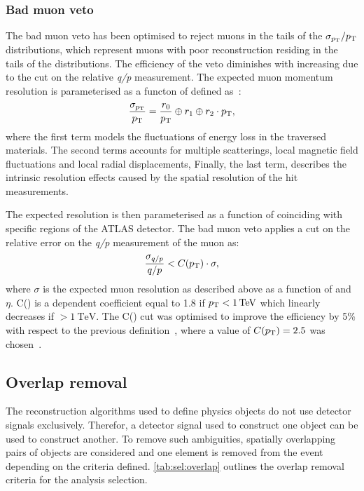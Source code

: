 \subsubsection{Bad muon veto}\label{sec:selmm:badmuon}
The bad muon veto has been optimised to reject muons in the tails of the $\sigma_{p_{\text{T}}}/p_{\text{T}}$ distributions, which represent muons with poor reconstruction residing in the tails of the \pt distributions. The efficiency of the veto diminishes with increasing \pt due to the cut on the relative \emph{q/p} measurement. The expected muon momentum resolution is parameterised as a functon of \pt defined as~\cite{Aad:2016jkr}:
\begin{equation}
   \frac{\sigma_{p_{\text{T}}}}{p_{\text{T}}} = \frac{r_0}{p_{\text{T}}} \oplus r_1 \oplus r_2 \cdot p_{\text{T}},
\end{equation}
where the first term models the fluctuations of energy loss in the traversed materials. The second terms accounts for multiple scatterings, local magnetic field fluctuations and local radial displacements, Finally, the last term, describes the intrinsic resolution effects caused by the spatial resolution of the hit measurements. 

The expected resolution is then parameterised as a function of \pt coinciding with specific regions of the ATLAS detector. The bad muon veto applies a cut on the relative error on the \emph{q/p} measurement of the muon as: 
\begin{equation}
    \frac{\sigma_{q/p}}{q/p} < C(p_{\text{T}}) \cdot \sigma,
 \end{equation}
where $\sigma$ is the expected muon resolution as described above as a function of \pt and $\eta$. C(\pt) is a \pt dependent coefficient equal to 1.8 if $\pt < \SI{1}{\tera\electronvolt}$ which linearly decreases if \pt $> \SI{1}{\tera\electronvolt}$. The C(\pt) cut was optimised to improve the efficiency by 5\% with respect to the previous definition~\cite{EXOT-2016-05}, where a value of $C(p_{\text{T}}) = 2.5$ was chosen~\cite{Aad:2019fac}. 

\subsection{Overlap removal}
The reconstruction algorithms used to define physics objects do not use detector signals exclusively. Therefor, a detector signal used to construct one object can be used to construct another. To remove such ambiguities, spatially overlapping pairs of objects are considered and one element is removed from the event depending on the criteria defined. \cref{tab:sel:overlap} outlines the overlap removal criteria for the analysis selection. 

